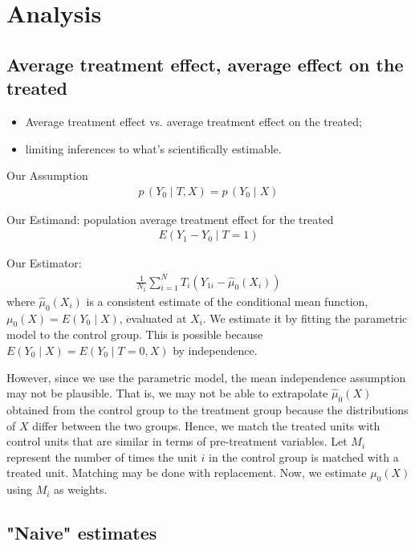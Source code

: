 \documentclass[11pt,titlepage]{article}
\begin{document}
\section{Analysis}
\label{analysis}
\subsection{Average treatment effect, average effect on the treated}

\begin{itemize} 
\item Average treatment effect vs. average
  treatment effect on the treated; 
\item limiting inferences to what's
  scientifically estimable. 
\end{itemize}

Our Assumption
\begin{eqnarray}
  p\,(Y_0 \mid T,  X) = p\,(Y_0 \mid X)
\end{eqnarray}

Our Estimand: population average treatment effect for the treated
\begin{eqnarray}
  E(Y_1 - Y_0 \mid T=1)
\end{eqnarray}

Our Estimator:
\begin{eqnarray}
    \frac{1}{N_1} \sum_{i=1}^{N} T_i (Y_{1i} - \hat{\mu}_0(X_i))
\end{eqnarray}
where $\hat{\mu}_0(X_i)$ is a consistent estimate of the conditional
mean function, $\mu_{0}(X)= E(Y_0 \mid X)$, evaluated at $X_i$.  We
estimate it by fitting the parametric model to the control group.
This is possible because $E(Y_0 \mid X)=E(Y_0 \mid T=0,X)$ by
independence.


However, since we use the parametric model, the mean independence
assumption may not be plausible. That is, we may not be able to
extrapolate $\hat{\mu}_{0}(X)$ obtained from the control group to the
treatment group because the distributions of $X$ differ between the
two groups.  Hence, we match the treated units with control units that
are similar in terms of pre-treatment variables. Let $M_i$ represent
the number of times the unit $i$ in the control group is matched with
a treated unit.  Matching may be done with replacement.  Now, we
estimate $\mu_{0}(X)$ using $M_i$ as weights.


\subsection{"Naive" estimates}
\end{document}
